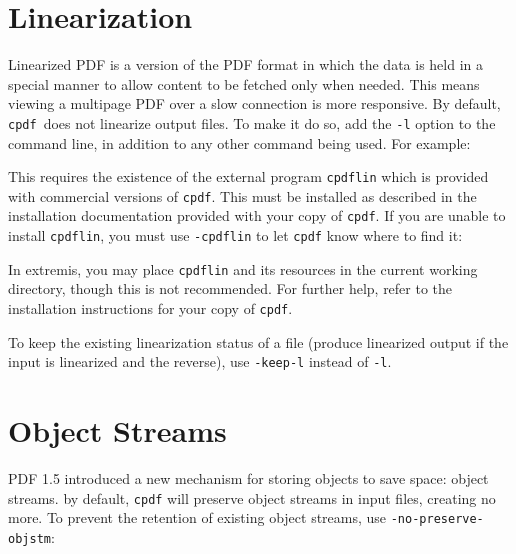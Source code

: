 \documentclass{book}
\newcommand{\cpdf}{\texttt{cpdf}}
\begin{document}
\section{Linearization}
Linearized PDF is a version of the PDF format in which the data is held in a
special manner to allow content to be fetched only when needed. This means
viewing a multipage PDF over a slow connection is more responsive. By default,
\cpdf\ does not linearize output files. To make it do so, add the \texttt{-l}
option to the command line, in addition to any other command being used. For example:

\noindent{}


\noindent This requires the existence of the external program \texttt{cpdflin} which is provided with commercial versions of \texttt{cpdf}. This must be installed as described in the installation documentation provided with your copy of \texttt{cpdf}. If you are unable to install \texttt{cpdflin}, you must use \texttt{-cpdflin} to let \texttt{cpdf} know where to find it:

\noindent{}


In extremis, you may place \texttt{cpdflin} and its resources in the current working directory, though this is not recommended. For further help, refer to the installation instructions for your copy of \texttt{cpdf}.

To keep the existing linearization status of a file (produce linearized output if the input is linearized and the reverse), use \texttt{-keep-l} instead of \texttt{-l}.

\section{Object Streams}
PDF 1.5 introduced a new mechanism for storing objects to save space: object streams. by default, \texttt{cpdf} will preserve object streams in input files, creating no more. To prevent the retention of existing object streams, use \texttt{-no-preserve-objstm}:
\end{document}
